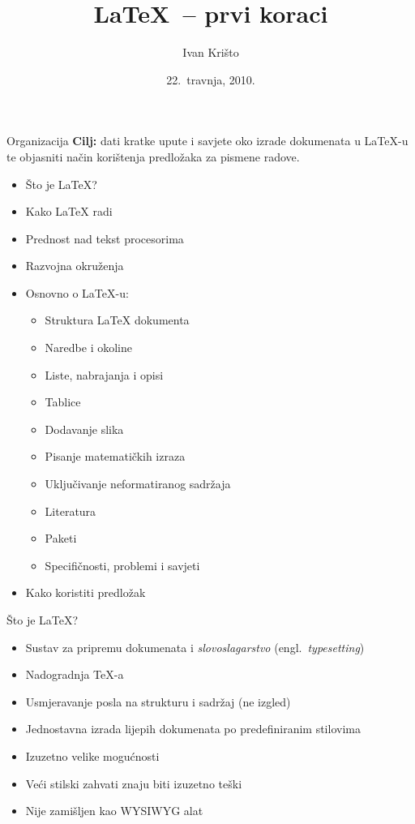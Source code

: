\documentclass{beamer}
\title{\LaTeX\ -- prvi koraci}
\author{Ivan Krišto}
\institute{Fakultet elektrotehnike i računarstva, Zagreb}
\date{22.~travnja, 2010.}
\begin{document}
\begin{frame}[t,plain]
\titlepage
\end{frame}

\begin{frame}[t]{Organizacija}
\textbf{Cilj:} dati kratke upute i savjete oko izrade dokumenata u \LaTeX-u te
objasniti način korištenja predložaka za pismene radove.

\pause
\begin{multicols}{2}
\begin{itemize}
  \item Što je \LaTeX{}?
  \item Kako \LaTeX{} radi
  \item Prednost nad tekst procesorima
  \item Razvojna okruženja
\pause
  \item Osnovno o \LaTeX-u:
  \begin{itemize}
    \item Struktura \LaTeX{} dokumenta
    \item Naredbe i okoline
    \item Liste, nabrajanja i opisi
    \item Tablice
    \item Dodavanje slika
    \item Pisanje matematičkih izraza
    \item Uključivanje neformatiranog sadržaja 
    \item Literatura
    \item Paketi
    \item Specifičnosti, problemi i savjeti
  \end{itemize}
\pause
  \item Kako koristiti predložak
\end{itemize}
\end{multicols}
\end{frame}

\begin{frame}[t]{Što je \LaTeX{}?}
\begin{itemize}
  \item Sustav za pripremu dokumenata i \emph{slovoslagarstvo} (engl.\ \emph{typesetting})
  \item Nadogradnja \TeX-a
  \item Usmjeravanje posla na strukturu i sadržaj (ne izgled)
  \item Jednostavna izrada lijepih dokumenata po predefiniranim stilovima
  \item Izuzetno velike mogućnosti
  \item Veći stilski zahvati znaju biti izuzetno teški
  \item Nije zamišljen kao WYSIWYG alat
\end{itemize}
\end{frame}
\end{document}
